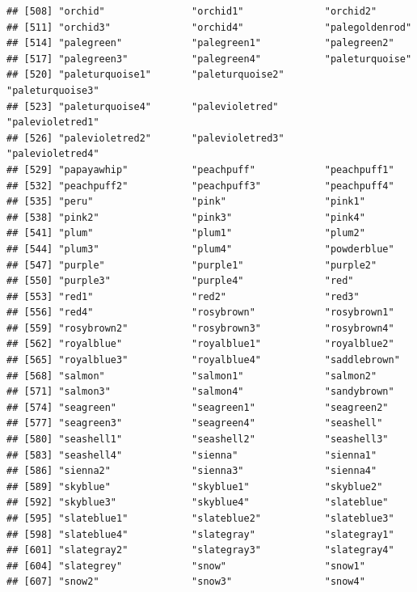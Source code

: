 \documentclass[]{book}
\begin{document}
\begin{verbatim}
## [508] "orchid"               "orchid1"              "orchid2"             
## [511] "orchid3"              "orchid4"              "palegoldenrod"       
## [514] "palegreen"            "palegreen1"           "palegreen2"          
## [517] "palegreen3"           "palegreen4"           "paleturquoise"       
## [520] "paleturquoise1"       "paleturquoise2"       "paleturquoise3"      
## [523] "paleturquoise4"       "palevioletred"        "palevioletred1"      
## [526] "palevioletred2"       "palevioletred3"       "palevioletred4"      
## [529] "papayawhip"           "peachpuff"            "peachpuff1"          
## [532] "peachpuff2"           "peachpuff3"           "peachpuff4"          
## [535] "peru"                 "pink"                 "pink1"               
## [538] "pink2"                "pink3"                "pink4"               
## [541] "plum"                 "plum1"                "plum2"               
## [544] "plum3"                "plum4"                "powderblue"          
## [547] "purple"               "purple1"              "purple2"             
## [550] "purple3"              "purple4"              "red"                 
## [553] "red1"                 "red2"                 "red3"                
## [556] "red4"                 "rosybrown"            "rosybrown1"          
## [559] "rosybrown2"           "rosybrown3"           "rosybrown4"          
## [562] "royalblue"            "royalblue1"           "royalblue2"          
## [565] "royalblue3"           "royalblue4"           "saddlebrown"         
## [568] "salmon"               "salmon1"              "salmon2"             
## [571] "salmon3"              "salmon4"              "sandybrown"          
## [574] "seagreen"             "seagreen1"            "seagreen2"           
## [577] "seagreen3"            "seagreen4"            "seashell"            
## [580] "seashell1"            "seashell2"            "seashell3"           
## [583] "seashell4"            "sienna"               "sienna1"             
## [586] "sienna2"              "sienna3"              "sienna4"             
## [589] "skyblue"              "skyblue1"             "skyblue2"            
## [592] "skyblue3"             "skyblue4"             "slateblue"           
## [595] "slateblue1"           "slateblue2"           "slateblue3"          
## [598] "slateblue4"           "slategray"            "slategray1"          
## [601] "slategray2"           "slategray3"           "slategray4"          
## [604] "slategrey"            "snow"                 "snow1"               
## [607] "snow2"                "snow3"                "snow4"               

\end{verbatim}
\end{document}
